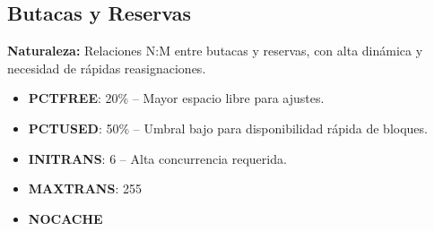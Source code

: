 \subsection{Butacas y Reservas}
\textbf{Naturaleza:} Relaciones N:M entre butacas y reservas, con alta dinámica y necesidad de rápidas reasignaciones.
\begin{itemize}
    \item \textbf{PCTFREE}: 20\% -- Mayor espacio libre para ajustes.
    \item \textbf{PCTUSED}: 50\% -- Umbral bajo para disponibilidad rápida de bloques.
    \item \textbf{INITRANS}: 6 -- Alta concurrencia requerida.
    \item \textbf{MAXTRANS}: 255
    \item \textbf{NOCACHE}
\end{itemize}
